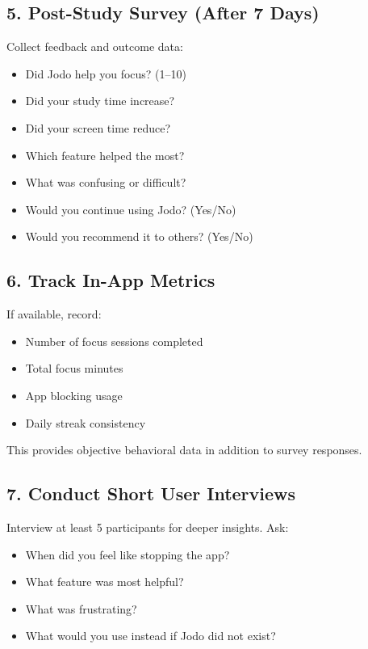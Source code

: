 \documentclass[12pt]{article}
\begin{document}
\subsection{5. Post-Study Survey (After 7 Days)}

Collect feedback and outcome data:

\begin{itemize}
    \item Did Jodo help you focus? (1--10)
    \item Did your study time increase?
    \item Did your screen time reduce?
    \item Which feature helped the most?
    \item What was confusing or difficult?
    \item Would you continue using Jodo? (Yes/No)
    \item Would you recommend it to others? (Yes/No)
\end{itemize}

\subsection{6. Track In-App Metrics}

If available, record:

\begin{itemize}
    \item Number of focus sessions completed
    \item Total focus minutes
    \item App blocking usage
    \item Daily streak consistency
\end{itemize}

This provides objective behavioral data in addition to survey responses.

\subsection{7. Conduct Short User Interviews}

Interview at least 5 participants for deeper insights. Ask:

\begin{itemize}
    \item When did you feel like stopping the app?
    \item What feature was most helpful?
    \item What was frustrating?
    \item What would you use instead if Jodo did not exist?
\end{itemize}
\end{document}
